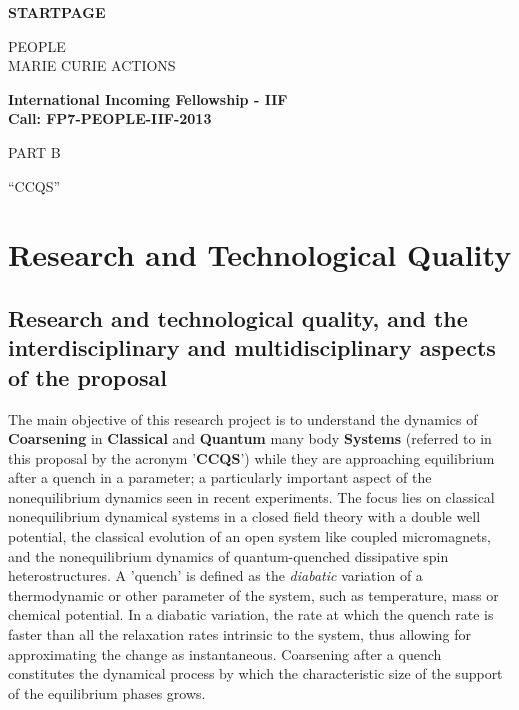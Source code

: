\documentclass[a4paper,11pt,color]{article}
\def\Acronimo{CCQS}
\begin{document}

\phantom{a}
\vspace{15mm}
\begin{center}


        \Large{
      
     
        \textbf{STARTPAGE}
  
          \vspace{15mm}
          PEOPLE\\
          MARIE CURIE ACTIONS\\
          \vspace{1cm}
          
          \textbf{International Incoming Fellowship  - IIF}\\
          \textbf{Call: FP7-PEOPLE-IIF-2013}
          \vspace{2cm}                   

          PART B
          \vspace{2cm}

          ``\Acronimo''
        }

  \end{center}
\vspace{1cm}
\newpage 
\tableofcontents

\pagebreak

\section{Research and Technological Quality}
\label{sec:sciTec}

 
\subsection{Research and technological quality, and the interdisciplinary and multidisciplinary aspects of the proposal}
\label{sec:sciTecQuality}

The main objective of this research project is to understand the dynamics of \textbf{Coarsening} in \textbf{Classical} and \textbf{Quantum} many body \textbf{Systems}
(referred to in this proposal by the acronym '\textbf{CCQS}') while they are approaching equilibrium after a quench in a  {parameter}; a particularly important aspect of the nonequilibrium dynamics seen in recent experiments. The focus lies on classical nonequilibrium dynamical systems in a closed field theory with a double well potential, the classical evolution of an open system like coupled micromagnets, and the nonequilibrium dynamics of quantum-quenched dissipative spin heterostructures. A 'quench' is defined as the \textit{diabatic} variation of a thermodynamic or other  {parameter} of the system, such as temperature, mass or chemical potential. In a diabatic variation, the rate at which the quench rate is faster than all the relaxation rates intrinsic to the system, thus allowing for approximating the change as instantaneous. 
Coarsening after a quench constitutes the dynamical process by which the characteristic  {size} of the support of the equilibrium phases grows.
\end{document}
